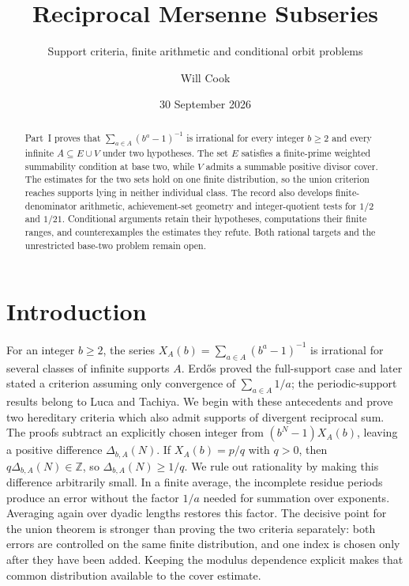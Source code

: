 \documentclass[11pt]{article}
\title{Reciprocal Mersenne Subseries}
\subtitle{Support criteria, finite arithmetic and conditional orbit problems}
\author{Will Cook}
\date{30 September 2026}
\theoremstyle{plain}
\theoremstyle{definition}
\theoremstyle{remark}
\begin{document}
\maketitle

\paperprovenance

\begin{abstract}
Part~I proves that $\sum_{a\in A}(b^a-1)^{-1}$ is irrational for every
integer $b\ge2$ and every infinite $A\subseteq E\cup V$ under two
hypotheses. The set $E$ satisfies a finite-prime weighted summability
condition at base two, while $V$ admits a summable positive divisor cover.
The estimates for the two sets hold on one finite distribution, so the
union criterion reaches supports lying in neither individual class.
The record also develops finite-denominator arithmetic, achievement-set
geometry and integer-quotient tests for $1/2$ and $1/21$. Conditional
arguments retain their hypotheses, computations their finite ranges, and
counterexamples the estimates they refute. Both rational targets and the
unrestricted base-two problem remain open.
\end{abstract}

\section*{Introduction}
For an integer $b\ge2$, the series $X_A(b)=\sum_{a\in A}(b^a-1)^{-1}$
is irrational for several classes of infinite supports $A$. Erd\H{o}s proved the full-support case
and later stated a criterion assuming only convergence of
$\sum_{a\in A}1/a$; the periodic-support results belong to Luca and
Tachiya. We begin with these antecedents and prove two hereditary
criteria which also admit supports of divergent reciprocal sum.
The proofs subtract an explicitly chosen integer from $(b^N-1)X_A(b)$,
leaving a positive difference $\Delta_{b,A}(N)$. If $X_A(b)=p/q$ with
$q>0$, then $q\Delta_{b,A}(N)\in\mathbb Z$, so
$\Delta_{b,A}(N)\ge1/q$. We rule out rationality by making this
difference arbitrarily small. In a finite average, the incomplete residue periods produce an error
without the factor $1/a$ needed for summation over exponents. Averaging
again over dyadic lengths restores this factor. The decisive point for the
union theorem is stronger than proving the two criteria separately: both
errors are controlled on the same finite distribution, and one index is
chosen only after they have been added. Keeping the modulus dependence
explicit makes that common distribution available to the cover estimate.
\end{document}
